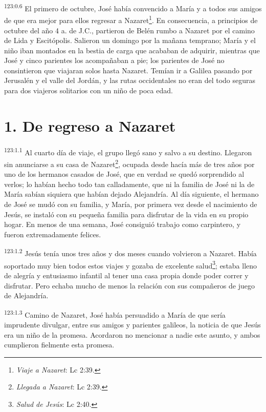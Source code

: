 \par 
\textsuperscript{123:0.6} El primero de octubre, José había convencido a María y a todos sus amigos de que era mejor para ellos regresar a Nazaret\footnote{\textit{Viaje a Nazaret}: Lc 2:39.}. En consecuencia, a principios de octubre del año 4 a. de J.C., partieron de Belén rumbo a Nazaret por el camino de Lida y Escitópolis. Salieron un domingo por la mañana temprano; María y el niño iban montados en la bestia de carga que acababan de adquirir, mientras que José y cinco parientes los acompañaban a pie; los parientes de José no consintieron que viajaran solos hasta Nazaret. Temían ir a Galilea pasando por Jerusalén y el valle del Jordán, y las rutas occidentales no eran del todo seguras para dos viajeros solitarios con un niño de poca edad.

\section*{1. De regreso a Nazaret}
\par 
\textsuperscript{123:1.1} Al cuarto día de viaje, el grupo llegó sano y salvo a su destino. Llegaron sin anunciarse a su casa de Nazaret\footnote{\textit{Llegada a Nazaret}: Lc 2:39.}, ocupada desde hacía más de tres años por uno de los hermanos casados de José, que en verdad se quedó sorprendido al verlos; lo habían hecho todo tan calladamente, que ni la familia de José ni la de María sabían siquiera que habían dejado Alejandría. Al día siguiente, el hermano de José se mudó con su familia, y María, por primera vez desde el nacimiento de Jesús, se instaló con su pequeña familia para disfrutar de la vida en su propio hogar. En menos de una semana, José consiguió trabajo como carpintero, y fueron extremadamente felices.

\par 
\textsuperscript{123:1.2} Jesús tenía unos tres años y dos meses cuando volvieron a Nazaret. Había soportado muy bien todos estos viajes y gozaba de excelente salud\footnote{\textit{Salud de Jesús}: Lc 2:40.}; estaba lleno de alegría y entusiasmo infantil al tener una casa propia donde poder correr y disfrutar. Pero echaba mucho de menos la relación con sus compañeros de juego de Alejandría.

\par 
\textsuperscript{123:1.3} Camino de Nazaret, José había persuadido a María de que sería imprudente divulgar, entre sus amigos y parientes galileos, la noticia de que Jesús era un niño de la promesa. Acordaron no mencionar a nadie este asunto, y ambos cumplieron fielmente esta promesa.

